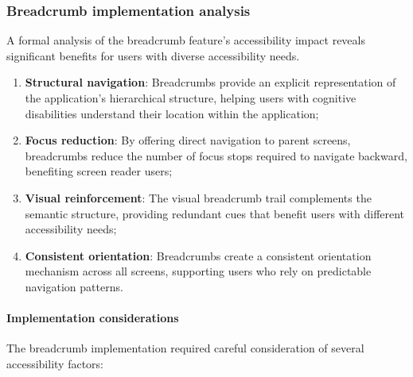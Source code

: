 \subsubsection{Breadcrumb implementation analysis}

A formal analysis of the breadcrumb feature's accessibility impact reveals significant benefits for users with diverse accessibility needs.

\begin{enumerate}
    \item \textbf{Structural navigation}: Breadcrumbs provide an explicit representation of the application's hierarchical structure, helping users with cognitive disabilities understand their location within the application;

    \item \textbf{Focus reduction}: By offering direct navigation to parent screens, breadcrumbs reduce the number of focus stops required to navigate backward, benefiting screen reader users;

    \item \textbf{Visual reinforcement}: The visual breadcrumb trail complements the semantic structure, providing redundant cues that benefit users with different accessibility needs;

    \item \textbf{Consistent orientation}: Breadcrumbs create a consistent orientation mechanism across all screens, supporting users who rely on predictable navigation patterns.
\end{enumerate}

\paragraph{Implementation considerations}

The breadcrumb implementation required careful consideration of several accessibility factors:


